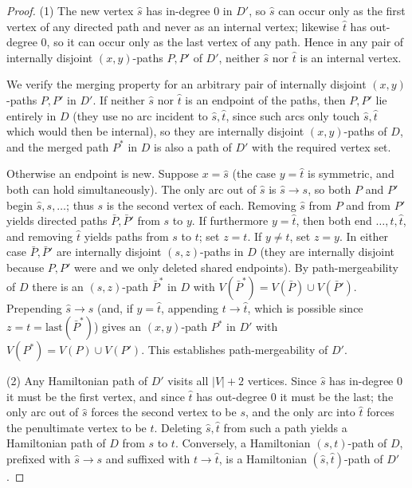\documentclass[12pt]{article}
\theoremstyle{definition}
\newcommand{\Vv}{V}
\begin{document}
\begin{proof}
(1) The new vertex $\hat s$ has in-degree $0$ in $D'$, so $\hat s$ can occur only
as the first vertex of any directed path and never as an internal vertex; likewise
$\hat t$ has out-degree $0$, so it can occur only as the last vertex of any path.
Hence in any pair of internally disjoint $(x,y)$-paths $P,P'$ of $D'$, neither
$\hat s$ nor $\hat t$ is an internal vertex.

We verify the merging property for an arbitrary pair of internally disjoint
$(x,y)$-paths $P,P'$ in $D'$. If neither $\hat s$ nor $\hat t$ is an endpoint of
the paths, then $P,P'$ lie entirely in $D$ (they use no arc incident to
$\hat s,\hat t$, since such arcs only touch $\hat s,\hat t$ which would then be
internal), so they are internally disjoint $(x,y)$-paths of $D$, and the merged
path $P^{*}$ in $D$ is also a path of $D'$ with the required vertex set.

Otherwise an endpoint is new. Suppose $x=\hat s$ (the case $y=\hat t$ is symmetric,
and both can hold simultaneously). The only arc out of $\hat s$ is $\hat s\to s$,
so both $P$ and $P'$ begin $\hat s,s,\dots$; thus $s$ is the second vertex of each.
Removing $\hat s$ from $P$ and from $P'$ yields directed paths $\bar P,\bar P'$ from
$s$ to $y$. If furthermore $y=\hat t$, then both end $\dots,t,\hat t$, and removing
$\hat t$ yields paths from $s$ to $t$; set $z=t$. If $y\neq\hat t$, set $z=y$. In
either case $\bar P,\bar P'$ are internally disjoint $(s,z)$-paths in $D$ (they are
internally disjoint because $P,P'$ were and we only deleted shared endpoints). By
path-mergeability of $D$ there is an $(s,z)$-path $\bar P^{*}$ in $D$ with
$V(\bar P^{*})=V(\bar P)\cup V(\bar P')$. Prepending $\hat s\to s$ (and, if
$y=\hat t$, appending $t\to\hat t$, which is possible since $z=t=\mathrm{last}
(\bar P^{*})$) gives an $(x,y)$-path $P^{*}$ in $D'$ with
$V(P^{*})=V(P)\cup V(P')$. This establishes path-mergeability of $D'$.

(2) Any Hamiltonian path of $D'$ visits all $|\Vv|+2$ vertices. Since $\hat s$ has
in-degree $0$ it must be the first vertex, and since $\hat t$ has out-degree $0$ it
must be the last; the only arc out of $\hat s$ forces the second vertex to be $s$,
and the only arc into $\hat t$ forces the penultimate vertex to be $t$. Deleting
$\hat s,\hat t$ from such a path yields a Hamiltonian path of $D$ from $s$ to $t$.
Conversely, a Hamiltonian $(s,t)$-path of $D$, prefixed with $\hat s\to s$ and
suffixed with $t\to\hat t$, is a Hamiltonian $(\hat s,\hat t)$-path of $D'$.
\end{proof}
\end{document}
